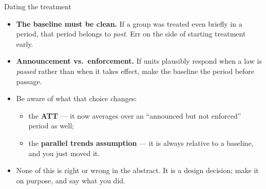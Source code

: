 \documentclass[
  11pt,
  ignorenonframetext,
  aspectratio=169,
]{beamer}
\providecommand{\tightlist}{%
  \setlength{\itemsep}{0pt}\setlength{\parskip}{0pt}}
\begin{document}
\begin{frame}{Dating the treatment}
\protect{}\label{dating-the-treatment}
\begin{itemize}
\tightlist
\item
  \textbf{The baseline must be clean.} If a group was treated even
  briefly in a period, that period belongs to \emph{post}. Err on the
  side of starting treatment early.
\item
  \textbf{Announcement vs.~enforcement.} If units plausibly respond when
  a law is \emph{passed} rather than when it takes effect, make the
  baseline the period before passage.
\end{itemize}

\vspace{0.3em}

\begin{itemize}
\tightlist
\item
  Be aware of what that choice changes:

  \begin{itemize}
  \tightlist
  \item
    the \textbf{ATT} --- it now averages over an ``announced but not
    enforced'' period as well;
  \item
    the \textbf{parallel trends assumption} --- it is always relative to
    a baseline, and you just moved it.
  \end{itemize}
\item
  None of this is right or wrong in the abstract. It is a design
  decision; make it on purpose, and say what you did.
\end{itemize}
\end{frame}
\end{document}
